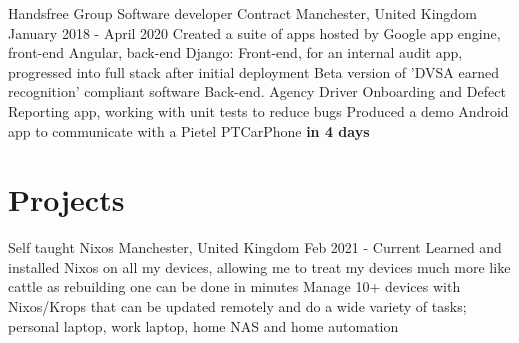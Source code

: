 \documentclass{my_cv}
\begin{document}
\workDetails
{Handsfree Group}
{Software developer}
{Contract} %
{Manchester, United Kingdom}
{January 2018 - April 2020}
\workdetails
{Created a suite of apps hosted by Google app engine, front-end Angular, back-end Django:}
{Front-end, for an internal audit app, progressed into full stack after initial deployment}
{Beta version of 'DVSA earned recognition' compliant software }
{Back-end. Agency Driver Onboarding and Defect Reporting app, working with unit tests to reduce bugs}
{Produced a demo Android app to communicate with a Pietel PTCarPhone \textbf{in 4 days}}
\stopworkdetails
%



\section{Projects}
\experianceDetails
{Self taught}
{Nixos}
{}
{Manchester, United Kingdom}
{Feb 2021 - Current}
\workdetails
{Learned and installed Nixos on all my devices, allowing me to treat my devices much more like cattle as rebuilding one can be done in minutes}
{Manage 10+ devices with Nixos/Krops that can be updated remotely and do a wide variety of tasks; personal laptop, work laptop, home NAS and home automation }
\stopworkdetails
\end{document}
